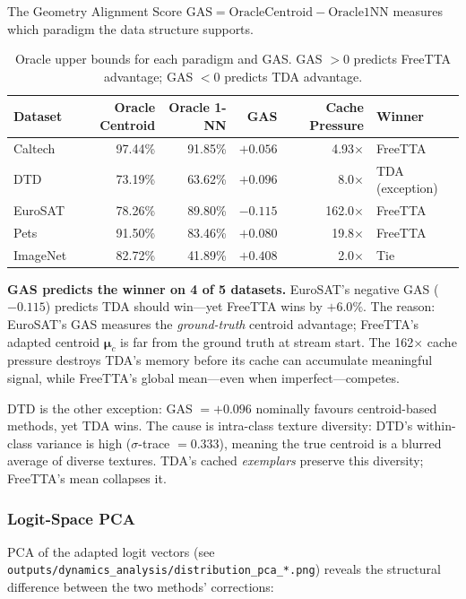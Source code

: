 \documentclass[12pt,a4paper]{article}
\newcommand{\bmu}{\boldsymbol{\mu}}
\newcommand{\1}{\mathbf{1}}
\begin{document}
The Geometry Alignment Score $\text{GAS} = \text{OracleCentroid} - \text{Oracle1NN}$ measures
which paradigm the data structure supports.

\begin{table}[H]
\centering
\caption{Oracle upper bounds for each paradigm and GAS. GAS $> 0$ predicts FreeTTA advantage;
GAS $< 0$ predicts TDA advantage.}
\label{tab:oracle_geometry}
\begin{tabular}{@{}lrrrrl@{}}
\toprule
Dataset & Oracle Centroid & Oracle 1-NN & GAS & Cache Pressure & Winner \\
\midrule
Caltech  & 97.44\% & 91.85\% & $+0.056$ & 4.93$\times$   & FreeTTA \\
DTD      & 73.19\% & 63.62\% & $+0.096$ & 8.0$\times$    & TDA (exception) \\
EuroSAT  & 78.26\% & 89.80\% & $-0.115$ & 162.0$\times$  & FreeTTA \\
Pets     & 91.50\% & 83.46\% & $+0.080$ & 19.8$\times$   & FreeTTA \\
ImageNet & 82.72\% & 41.89\% & $+0.408$ & 2.0$\times$    & Tie \\
\bottomrule
\end{tabular}
\end{table}

\textbf{GAS predicts the winner on 4 of 5 datasets.}
EuroSAT's negative GAS ($-0.115$) predicts TDA should win---yet FreeTTA wins by $+6.0\%$.
The reason: EuroSAT's GAS measures the \emph{ground-truth} centroid advantage; FreeTTA's adapted
centroid $\bmu_c$ is far from the ground truth at stream start.
The 162$\times$ cache pressure destroys TDA's memory before its cache can accumulate meaningful
signal, while FreeTTA's global mean---even when imperfect---competes.

DTD is the other exception: GAS $= +0.096$ nominally favours centroid-based methods, yet TDA
wins.
The cause is intra-class texture diversity: DTD's within-class variance is high
($\sigma$-trace $= 0.333$), meaning the true centroid is a blurred average of diverse textures.
TDA's cached \emph{exemplars} preserve this diversity; FreeTTA's mean collapses it.

\subsubsection{Logit-Space PCA}

PCA of the adapted logit vectors (see \texttt{outputs/dynamics\_analysis/distribution\_pca\_*.png})
reveals the structural difference between the two methods' corrections:
\end{document}
